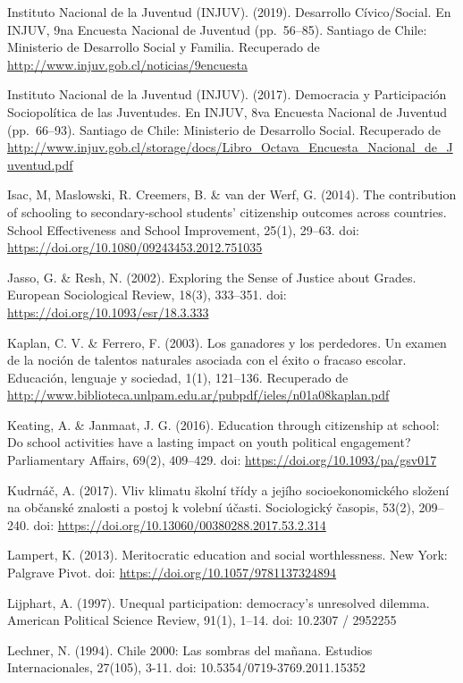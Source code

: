\documentclass[12pt,twoside]{templates/facsothesis}
\begin{document}
Instituto Nacional de la Juventud (INJUV). (2019). Desarrollo Cívico/Social. En INJUV, 9na Encuesta Nacional de Juventud (pp.~56--85). Santiago de Chile: Ministerio de Desarrollo Social y Familia. Recuperado de \url{http://www.injuv.gob.cl/noticias/9encuesta}

Instituto Nacional de la Juventud (INJUV). (2017). Democracia y Participación Sociopolítica de las Juventudes. En INJUV, 8va Encuesta Nacional de Juventud (pp.~66--93). Santiago de Chile: Ministerio de Desarrollo Social. Recuperado de \url{http://www.injuv.gob.cl/storage/docs/Libro_Octava_Encuesta_Nacional_de_Juventud.pdf}

Isac, M, Maslowski, R. Creemers, B. \& van der Werf, G. (2014). The contribution of schooling to secondary-school students' citizenship outcomes across countries. School Effectiveness and School Improvement, 25(1), 29--63. doi: \url{https://doi.org/10.1080/09243453.2012.751035}

Jasso, G. \& Resh, N. (2002). Exploring the Sense of Justice about Grades. European Sociological Review, 18(3), 333--351. doi: \url{https://doi.org/10.1093/esr/18.3.333}

Kaplan, C. V. \& Ferrero, F. (2003). Los ganadores y los perdedores. Un examen de la noción de talentos naturales asociada con el éxito o fracaso escolar. Educación, lenguaje y sociedad, 1(1), 121--136. Recuperado de \url{http://www.biblioteca.unlpam.edu.ar/pubpdf/ieles/n01a08kaplan.pdf}

Keating, A. \& Janmaat, J. G. (2016). Education through citizenship at school: Do school activities have a lasting impact on youth political engagement? Parliamentary Affairs, 69(2), 409--429. doi: \url{https://doi.org/10.1093/pa/gsv017}

Kudrnáč, A. (2017). Vliv klimatu školní třídy a jejího socioekonomického složení na občanské znalosti a postoj k volební účasti. Sociologický časopis, 53(2), 209--240. doi: \url{https://doi.org/10.13060/00380288.2017.53.2.314}

Lampert, K. (2013). Meritocratic education and social worthlessness. New York: Palgrave Pivot. doi: \url{https://doi.org/10.1057/9781137324894}

Lijphart, A. (1997). Unequal participation: democracy's unresolved dilemma. American Political Science Review, 91(1), 1--14. doi: 10.2307 / 2952255

Lechner, N. (1994). Chile 2000: Las sombras del mañana. Estudios Internacionales, 27(105), 3-11. doi: 10.5354/0719-3769.2011.15352
\end{document}
